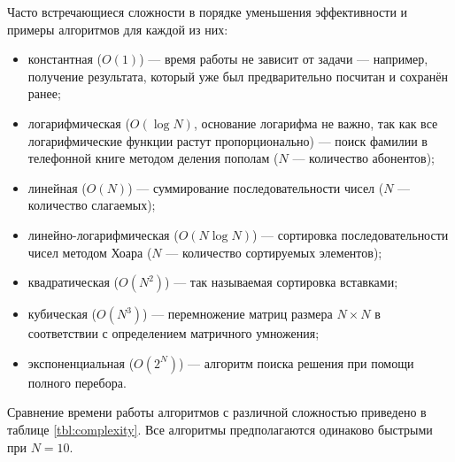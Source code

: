 Часто встречающиеся сложности в порядке уменьшения эффективности и
примеры алгоритмов для каждой из них:

\begin{itemize}
\item константная ($O(1)$) — время работы не зависит от задачи —
  например, получение результата, который уже был предварительно
  посчитан и сохранён ранее;
\item логарифмическая ($O(\log N)$, основание логарифма не важно, так
  как все логарифмические функции растут пропорционально) — поиск
  фамилии в телефонной книге методом деления пополам ($N$ — количество
  абонентов);
\item линейная ($O(N)$) — суммирование последовательности чисел ($N$ —
  количество слагаемых);
\item линейно-логарифмическая ($O(N\log N)$) — сортировка
  последовательности чисел методом Хоара ($N$ — количество сортируемых
  элементов);
\item квадратическая ($O(N^{2})$) — так называемая сортировка вставками;
\item кубическая ($O(N^{3})$) — перемножение матриц размера $N\times
  N$ в соответствии с определением матричного умножения;
\item экспоненциальная ($O(2^{N})$) — алгоритм поиска решения при
  помощи полного перебора.
\end{itemize}

Сравнение времени работы алгоритмов с различной сложностью приведено в
таблице \ref{tbl:complexity}. Все алгоритмы предполагаются одинаково
быстрыми при $N=10$.

